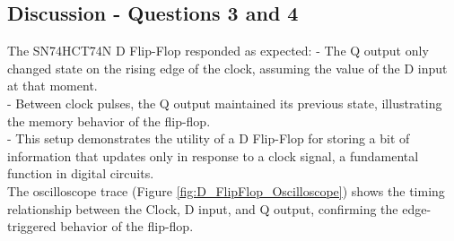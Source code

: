 \documentclass{article}
\begin{document}
    \subsection*{\textbf{Discussion - Questions 3 and 4}}
    The SN74HCT74N D Flip-Flop responded as expected:
    - The Q output only changed state on the rising edge of the clock, assuming the value of the D input at that moment.
    \\
    - Between clock pulses, the Q output maintained its previous state, illustrating the memory behavior of the flip-flop.
    \\
    - This setup demonstrates the utility of a D Flip-Flop for storing a bit of information that updates only in response to a clock signal, a fundamental function in digital circuits.
    \\

    The oscilloscope trace (Figure \ref{fig:D_FlipFlop_Oscilloscope}) shows the timing relationship between the Clock, D input, and Q output, confirming the edge-triggered behavior of the flip-flop.

  
\end{document}
